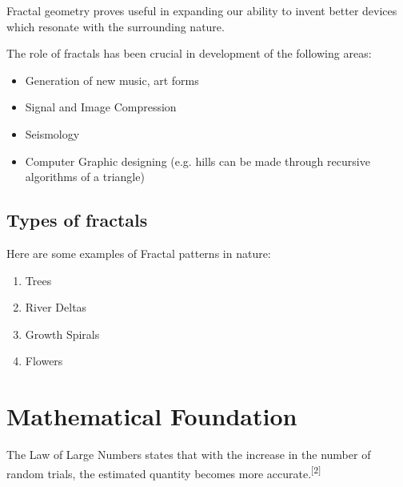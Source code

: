 \documentclass{resonance}
\begin{document}
	Fractal geometry proves useful in expanding our ability to invent better devices which resonate with the surrounding nature.
	
	The role of fractals has been crucial in development of the following areas:
	
	\begin{itemize}
		\item Generation of new music, art forms   
		\item Signal and Image Compression    
		\item Seismology
		\item Computer Graphic designing (e.g. hills can be made through recursive algorithms of a triangle)
	\end{itemize}
	
	\subsection*{Types of fractals}
	
	Here are some examples of Fractal patterns in nature:
	
	
	\begin{enumerate}
		\item Trees
		\item River Deltas
		\item Growth Spirals
		\item Flowers
	\end{enumerate}
	
	\section*{Mathematical Foundation}
	The Law of Large Numbers states that with the increase in the number of random trials, the estimated quantity becomes more accurate.\textsuperscript{[2]}
	
\end{document}

